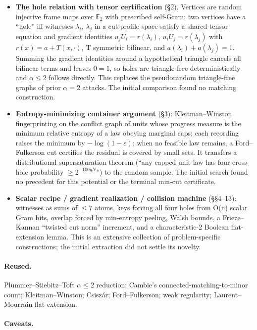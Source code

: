 \documentclass[11pt]{article}
\newcommand{\F}{\mathbb{F}}
\begin{document}
\begin{itemize}
\item \textbf{The hole relation with tensor certification} (\S{}2). Vertices are random injective frame maps over $\F_2$ with prescribed self-Gram; two vertices have a ``hole'' iff witnesses $\lambda_i$, $\lambda_j$ in a cut-profile space satisfy a shared-tensor equation and gradient identities $u_jU_i=r(\lambda_i)$, $u_iU_j=r(\lambda_j)$ with $r(x)=a+T(x,\cdot)$, T symmetric bilinear, and $a(\lambda_i)+a(\lambda_j)=1$. Summing the gradient identities around a hypothetical triangle cancels all bilinear terms and leaves $0=1$, so holes are triangle-free deterministically and $\alpha \le 2$ follows directly. This replaces the pseudorandom triangle-free graphs of prior $\alpha=2$ attacks. The initial comparison found no matching construction.
\item \textbf{Entropy-minimizing container argument} (\S{}3): Kleitman--Winston fingerprinting on the conflict graph of units whose progress measure is the minimum relative entropy of a law obeying marginal caps; each recording raises the minimum by $-\log(1-\varepsilon)$; when no feasible law remains, a Ford--Fulkerson cut certifies the residual is covered by small sets. It transfers a distributional supersaturation theorem (``any capped unit law has four-cross-hole probability $\ge2^{-100gN}$'') to the random sample. The initial search found no precedent for this potential or the terminal min-cut certificate.
\item \textbf{Scalar recipe / gradient realization / collision machine} (\S{}\S{}4--13): witnesses as sums of $\le 7$ atoms, keys forcing all four holes from O(n) scalar Gram bits, overlap forced by min-entropy peeling, Walsh bounds, a Frieze--Kannan ``twisted cut norm'' increment, and a characteristic-2 Boolean flat-extension lemma. This is an extensive collection of problem-specific constructions; the initial extraction did not settle its novelty.
\end{itemize}

\paragraph{Reused.}

Plummer--Stiebitz--Toft $\alpha \le 2$ reduction; Cambie's connected-matching-to-minor count; Kleitman--Winston; Csiszár; Ford--Fulkerson; weak regularity; Laurent--Mourrain flat extension.

\paragraph{Caveats.}
\end{document}
